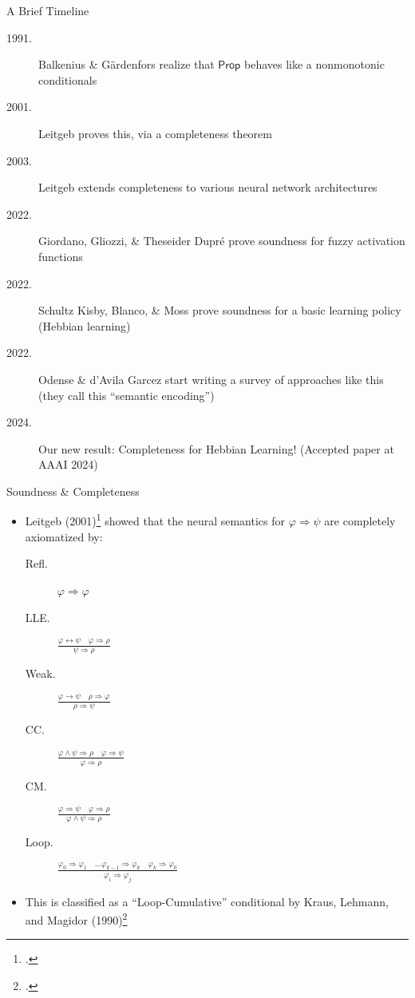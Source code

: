 \documentclass[12pt,t]{beamer}
\theoremstyle{definition}
\newcommand{\Prop}{\mathsf{Prop}}
\begin{document}
\begin{frame}{A Brief Timeline}
\vspace{1ex}
\centering

\begin{description}
    \item[1991.] Balkenius \& G{\"a}rdenfors realize that $\Prop$ behaves like a nonmonotonic conditionals
    \item[2001.] Leitgeb proves this, via a completeness theorem
    \item[2003.] Leitgeb extends completeness to various neural network architectures
    \item[2022.] Giordano, Gliozzi, \& Theseider Dupré prove soundness for fuzzy activation functions
    \item[2022.] Schultz Kisby, Blanco, \& Moss prove soundness for a basic learning policy (Hebbian learning)
    \item[2022.] Odense \& d’Avila Garcez start writing a survey of approaches like this (they call this ``semantic encoding'')
    \item[2024.] Our new result: Completeness for Hebbian Learning!  (Accepted paper at AAAI 2024)
\end{description}

\end{frame}



\begin{frame}{Soundness \& Completeness}
\vspace{1ex}
\begin{itemize}
\item Leitgeb (2001)\footcite{leitgeb2001nonmonotonic} showed that the neural semantics for $\varphi \Rightarrow \psi$ are completely axiomatized by:
\vspace{1ex}
\begin{description}
    \item[Refl.] $\varphi \Rightarrow \varphi$
    \item[LLE.] $\frac{\varphi \leftrightarrow \psi \quad \varphi \Rightarrow \rho}{\psi \Rightarrow \rho}$
    \item[Weak.] $\frac{\varphi \to \psi \quad \rho \Rightarrow \varphi}{\rho \Rightarrow \psi}$
    \item[CC.] $\frac{\varphi \land \psi \Rightarrow \rho \quad \varphi \Rightarrow \psi}{\varphi \Rightarrow \rho}$
    \item[CM.] $\frac{\varphi \Rightarrow \psi \quad \varphi \Rightarrow \rho}{\varphi \land \psi \Rightarrow \rho}$
    \item[Loop.] $\frac{\varphi_0 \Rightarrow \varphi_1 \quad \ldots \varphi_{k-1} \Rightarrow \varphi_{k} \quad \varphi_k \Rightarrow \varphi_0}{\varphi_i \Rightarrow \varphi_j}$
\end{description}

\vspace{1ex}
\item This is classified as a ``Loop-Cumulative'' conditional by Kraus, Lehmann, and Magidor (1990)\footcite{kraus1990nonmonotonic}
\end{itemize}
\end{frame}
\end{document}
